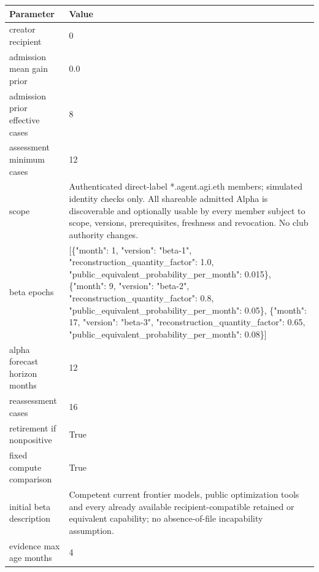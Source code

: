 \documentclass[10pt]{article}
\begin{document}
\begin{longtable}{p{.44\linewidth}p{.50\linewidth}}\toprule Parameter & Value \\\midrule\endhead

creator recipient & 0\\

admission mean gain prior & 0.0\\

admission prior effective cases & 8\\

assessment minimum cases & 12\\

scope & Authenticated direct-label *.agent.agi.eth members; simulated identity checks only. All shareable admitted Alpha is discoverable and optionally usable by every member subject to scope, versions, prerequisites, freshness and revocation. No club authority changes.\\

beta epochs & [\{"month": 1, "version": "beta-1", "reconstruction\_\allowbreak{}quantity\_\allowbreak{}factor": 1.0, "public\_\allowbreak{}equivalent\_\allowbreak{}probability\_\allowbreak{}per\_\allowbreak{}month": 0.015\}, \{"month": 9, "version": "beta-2", "reconstruction\_\allowbreak{}quantity\_\allowbreak{}factor": 0.8, "public\_\allowbreak{}equivalent\_\allowbreak{}probability\_\allowbreak{}per\_\allowbreak{}month": 0.05\}, \{"month": 17, "version": "beta-3", "reconstruction\_\allowbreak{}quantity\_\allowbreak{}factor": 0.65, "public\_\allowbreak{}equivalent\_\allowbreak{}probability\_\allowbreak{}per\_\allowbreak{}month": 0.08\}]\\

alpha forecast horizon months & 12\\

reassessment cases & 16\\

retirement if nonpositive & True\\

fixed compute comparison & True\\

initial beta description & Competent current frontier models, public optimization tools and every already available recipient-compatible retained or equivalent capability; no absence-of-file incapability assumption.\\

evidence max age months & 4\\


\end{longtable}
\end{document}

